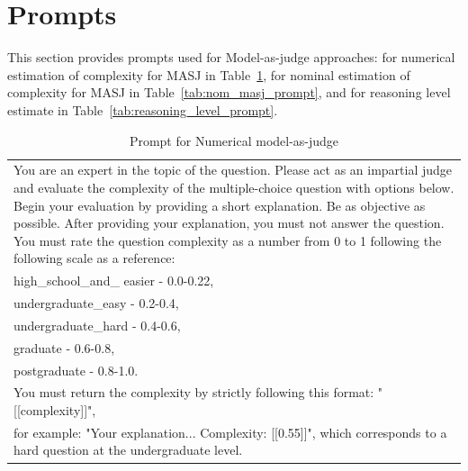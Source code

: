 \section{Prompts} \label{prompts}

This section provides prompts used for Model-as-judge approaches: for numerical estimation of complexity for MASJ in Table~\ref{tab:num_masj_prompt},
for nominal estimation of complexity for MASJ in Table~\ref{tab:nom_masj_prompt},
and for reasoning level estimate in Table~\ref{tab:reasoning_level_prompt}.

\begin{table}[H]
    \small
    \centering
    \caption{Prompt for Numerical model-as-judge}
    \label{tab:num_masj_prompt}
    \begin{tabular}{p{11cm}}
    \hline
    You are an expert in the topic of the question. Please act as an impartial judge and evaluate the complexity of the multiple-choice question with options below. Begin your evaluation by providing a short explanation. Be as objective as possible. After providing your explanation, you must not answer the question. You must rate the question complexity as a number from 0 to 1 following the following scale as a reference: \\
    high\_school\_and\_ easier - 0.0-0.22, \\
    undergraduate\_easy - 0.2-0.4, \\ 
    undergraduate\_hard - 0.4-0.6, \\ 
    graduate - 0.6-0.8, \\ postgraduate - 0.8-1.0. \\
    You must return the complexity by strictly following this format: "  
    [[complexity]]", \\ for example: "Your explanation... Complexity: [[0.55]]", which corresponds to a hard question at the undergraduate level.
    \\
    \hline 
    \end{tabular}
\end{table}

